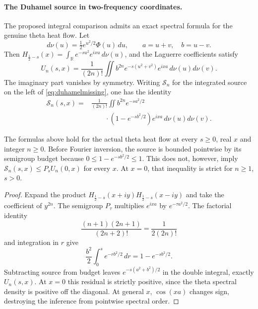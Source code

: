 \paragraph{The Duhamel source in two-frequency coordinates.}
The proposed integral comparison admits an exact
spectral formula for the genuine theta heat flow.
Let
\[
d\nu(u)=\tfrac12e^{u^2/2}\Phi(u)\,du,
\qquad a=u+v,\quad b=u-v.
\]
Then $H_{\frac12-s}(x)=
\int_{\mathbb R}e^{-su^2}e^{ixu}\,d\nu(u)$,
and the Laguerre coefficients satisfy
\begin{equation}
U_n(s,x)=\frac1{(2n)!}\iint b^{2n}
e^{-s(u^2+v^2)}e^{ixa}\,d\nu(u)d\nu(v).
\label{eq:duhamelspectralUn}
\end{equation}
The imaginary part vanishes by symmetry.
Writing $\mathcal S_n$ for the integrated
source on the left of \eqref{eq:duhamelmissing},
one has the identity
\begin{align}
\mathcal S_n(s,x)
={}&\frac1{(2n)!}\iint b^{2n}e^{-sa^2/2}\nonumber\\
&\qquad\cdot(1-e^{-sb^2/2})
e^{ixa}\,d\nu(u)d\nu(v).
\label{eq:duhamelspectralsource}
\end{align}

\begin{proposition}\label{prop:duhamelspectral}
The formulas above hold for the actual theta
heat flow at every $s\ge0$, real $x$ and
integer $n\ge0$. Before Fourier inversion,
the source is bounded pointwise by its
semigroup budget because
$0\le1-e^{-sb^2/2}\le1$.
This does not, however, imply
$\mathcal S_n(s,x)\le P_sU_n(0,x)$
for every $x$. At $x=0$, that
inequality is strict for $n\ge1$, $s>0$.
\end{proposition}
\begin{proof}
Expand the product
$H_{\frac12-s}(x+iy)H_{\frac12-s}(x-iy)$
and take the coefficient of $y^{2n}$.
The semigroup $P_\tau$ multiplies
$e^{ixa}$ by $e^{-\tau a^2/2}$.
The factorial identity
\[
\frac{(n+1)(2n+1)}{(2n+2)!}
=\frac1{2(2n)!}
\]
and integration in $r$ give
\[
\frac{b^2}{2}\int_0^s e^{-rb^2/2}\,dr
=1-e^{-sb^2/2}.
\]
Subtracting source from budget leaves
$e^{-s(a^2+b^2)/2}$ in the
double integral, exactly $U_n(s,x)$.
At $x=0$ this residual is strictly
positive, since the theta spectral
density is positive off the diagonal.
At general $x$, $\cos(xa)$ changes
sign, destroying the inference from
pointwise spectral order.
\end{proof}

